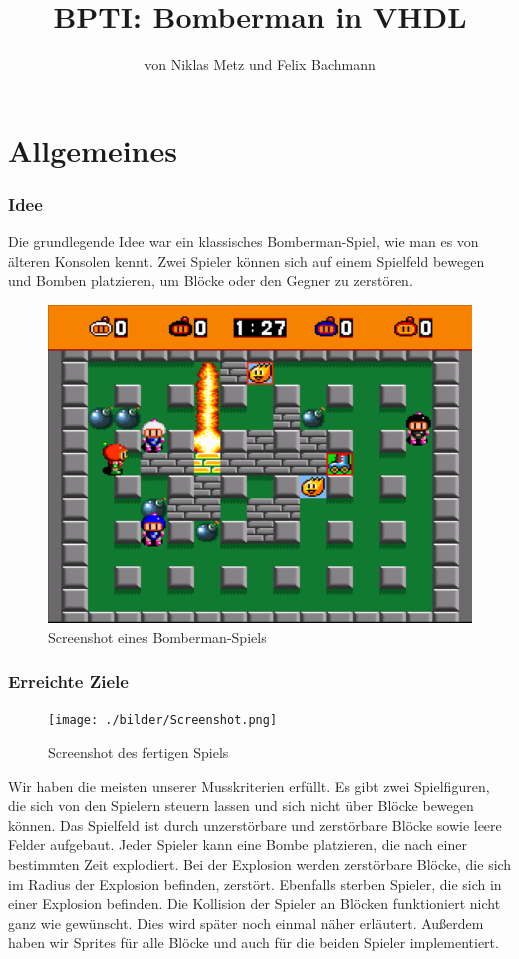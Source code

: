 \documentclass[parskip=full]{scrartcl}
\title{BPTI: Bomberman in VHDL}
\subtitle{von Niklas Metz und Felix Bachmann}
\begin{document}
	\maketitle
	\newpage
	\tableofcontents
	\newpage
	
	\part{Allgemeines}
		\section{Idee}
			Die grundlegende Idee war ein klassisches Bomberman-Spiel, wie man es von älteren Konsolen kennt. Zwei Spieler können sich auf einem Spielfeld bewegen und Bomben platzieren, um Blöcke oder den Gegner zu zerstören.
			\begin{figure}[H]
				\centering
				\includegraphics[scale=0.4]{./bilder/bomberman.png}
				\caption{Screenshot eines Bomberman-Spiels}
			\end{figure}
		
		\section{Erreichte Ziele}
			\begin{figure}[H]
				\centering
				\texttt{[image: ./bilder/Screenshot.png]}
				\caption{Screenshot des fertigen Spiels}
			\end{figure}
			Wir haben die meisten unserer Musskriterien erfüllt. Es gibt zwei Spielfiguren, die sich von den Spielern steuern lassen und sich nicht über Blöcke bewegen können. Das Spielfeld ist durch unzerstörbare und  zerstörbare Blöcke sowie leere Felder aufgebaut. Jeder Spieler kann eine Bombe platzieren, die nach einer bestimmten Zeit explodiert. Bei der Explosion werden zerstörbare Blöcke, die sich im Radius der Explosion befinden, zerstört. Ebenfalls sterben Spieler, die sich in einer Explosion befinden. Die Kollision der Spieler an Blöcken funktioniert nicht ganz wie gewünscht. Dies wird später noch einmal näher erläutert.\newline
			Außerdem haben wir Sprites für alle Blöcke und auch für die beiden Spieler implementiert. \newline
			
\end{document}
